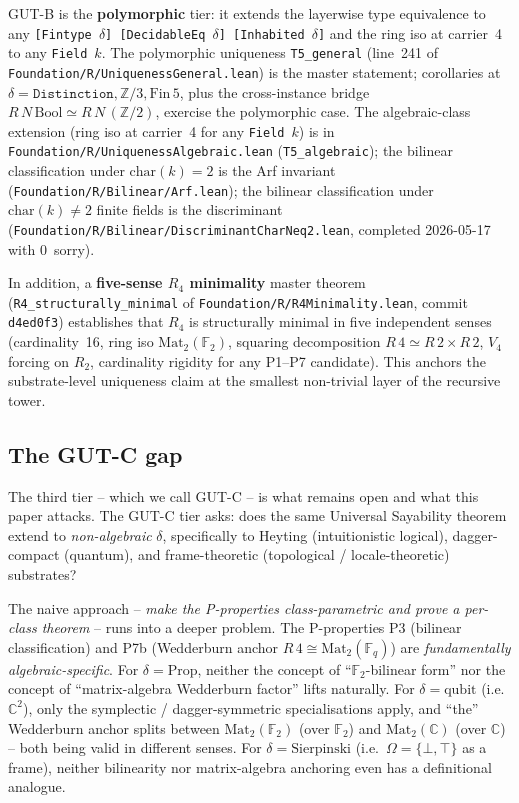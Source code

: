 \documentclass[11pt,a4paper]{article}
\theoremstyle{plain}
\theoremstyle{definition}
\theoremstyle{remark}
\newcommand{\F}{\mathbb{F}}
\newcommand{\C}{\mathbb{C}}
\newcommand{\Mat}{\mathrm{Mat}}
\newcommand{\Sierp}{\mathrm{Sierpinski}}
\begin{document}
GUT-B is the \textbf{polymorphic} tier: it extends the layerwise type equivalence to any \texttt{[Fintype $\delta$] [DecidableEq $\delta$] [Inhabited $\delta$]} and the ring iso at carrier~4 to any \texttt{Field}~$k$. The polymorphic uniqueness \texttt{T5\_general} (line~241 of \texttt{Foundation/R/UniquenessGeneral.lean}) is the master statement; corollaries at $\delta = \texttt{Distinction}, \mathbb{Z}/3, \mathrm{Fin}\,5$, plus the cross-instance bridge $R\,N\,\mathrm{Bool} \simeq R\,N\,(\mathbb{Z}/2)$, exercise the polymorphic case. The algebraic-class extension (ring iso at carrier~4 for any \texttt{Field}~$k$) is in \texttt{Foundation/R/UniquenessAlgebraic.lean} (\texttt{T5\_algebraic}); the bilinear classification under $\mathrm{char}(k)=2$ is the Arf invariant (\texttt{Foundation/R/Bilinear/Arf.lean}); the bilinear classification under $\mathrm{char}(k)\neq2$ finite fields is the discriminant (\texttt{Foundation/R/Bilinear/DiscriminantCharNeq2.lean}, completed 2026-05-17 with 0~sorry).

In addition, a \textbf{five-sense $R_4$ minimality} master theorem (\texttt{R4\_structurally\_minimal} of \texttt{Foundation/R/R4Minimality.lean}, commit \texttt{d4ed0f3}) establishes that $R_4$ is structurally minimal in five independent senses (cardinality~16, ring iso $\Mat_2(\F_2)$, squaring decomposition $R\,4 \simeq R\,2 \times R\,2$, $V_4$ forcing on $R_2$, cardinality rigidity for any P1--P7 candidate). This anchors the substrate-level uniqueness claim at the smallest non-trivial layer of the recursive tower.

\subsection{The GUT-C gap}\label{sec:intro:gap}

The third tier -- which we call GUT-C -- is what remains open and what this paper attacks. The GUT-C tier asks: does the same Universal Sayability theorem extend to \emph{non-algebraic} $\delta$, specifically to Heyting (intuitionistic logical), dagger-compact (quantum), and frame-theoretic (topological / locale-theoretic) substrates?

The naive approach -- \emph{make the P-properties class-parametric and prove a per-class theorem} -- runs into a deeper problem. The P-properties P3 (bilinear classification) and P7b (Wedderburn anchor $R\,4 \cong \Mat_2(\F_q)$) are \emph{fundamentally algebraic-specific}. For $\delta = \mathrm{Prop}$, neither the concept of ``$\F_2$-bilinear form'' nor the concept of ``matrix-algebra Wedderburn factor'' lifts naturally. For $\delta = \mathrm{qubit}$ (i.e.\ $\C^2$), only the symplectic / dagger-symmetric specialisations apply, and ``the'' Wedderburn anchor splits between $\Mat_2(\F_2)$ (over $\F_2$) and $\Mat_2(\C)$ (over $\C$) -- both being valid in different senses. For $\delta = \Sierp$ (i.e.\ $\Omega = \{\bot,\top\}$ as a frame), neither bilinearity nor matrix-algebra anchoring even has a definitional analogue.
\end{document}
